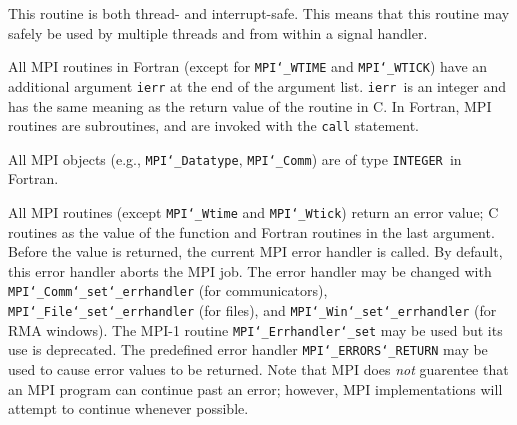 \par
{}
\par
This routine is both thread- and interrupt-safe.
This means that this routine may safely be used by multiple threads and
from within a signal handler.
\par
{}
All MPI routines in Fortran (except for {\tt MPI{\tt \char`\_}WTIME} and {\tt MPI{\tt \char`\_}WTICK}) have
an additional argument {\tt ierr} at the end of the argument list.  {\tt ierr
}is an integer and has the same meaning as the return value of the routine
in C.  In Fortran, MPI routines are subroutines, and are invoked with the
{\tt call} statement.
\par
All MPI objects (e.g., {\tt MPI{\tt \char`\_}Datatype}, {\tt MPI{\tt \char`\_}Comm}) are of type {\tt INTEGER
}in Fortran.
\par
{}
\par
All MPI routines (except {\tt MPI{\tt \char`\_}Wtime} and {\tt MPI{\tt \char`\_}Wtick}) return an error value;
C routines as the value of the function and Fortran routines in the last
argument.  Before the value is returned, the current MPI error handler is
called.  By default, this error handler aborts the MPI job.  The error handler
may be changed with {\tt MPI{\tt \char`\_}Comm{\tt \char`\_}set{\tt \char`\_}errhandler} (for communicators),
{\tt MPI{\tt \char`\_}File{\tt \char`\_}set{\tt \char`\_}errhandler} (for files), and {\tt MPI{\tt \char`\_}Win{\tt \char`\_}set{\tt \char`\_}errhandler} (for
RMA windows).  The MPI-1 routine {\tt MPI{\tt \char`\_}Errhandler{\tt \char`\_}set} may be used but
its use is deprecated.  The predefined error handler
{\tt MPI{\tt \char`\_}ERRORS{\tt \char`\_}RETURN} may be used to cause error values to be returned.
Note that MPI does {\em not} guarentee that an MPI program can continue past
an error; however, MPI implementations will attempt to continue whenever
possible.
\par
{}
\endmanpage
